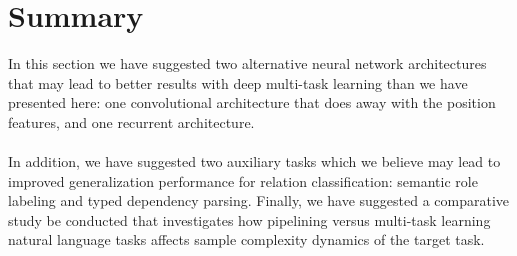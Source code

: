 \section{Summary}
In this section we have suggested two alternative neural network architectures that may lead to better results with deep multi-task learning than we have presented here: one convolutional architecture that does away with the position features, and one recurrent architecture.
\\\\
 In addition, we have suggested two auxiliary tasks which we believe may lead to improved generalization performance for relation classification: semantic role labeling and typed dependency parsing. Finally, we have suggested a comparative study be conducted that investigates how pipelining versus multi-task learning natural language tasks affects sample complexity dynamics of the target task.
